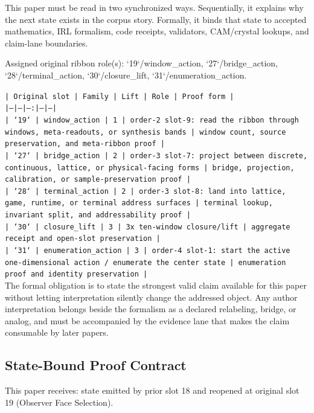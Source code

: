 \documentclass[11pt]{article}
\begin{document}
This paper must be read in two synchronized ways. Sequentially, it explains why
the next state exists in the corpus story. Formally, it binds that state to
accepted mathematics, IRL formalism, code receipts, validators, CAM/crystal
lookups, and claim-lane boundaries.

Assigned original ribbon role(s): `19`/window\_action, `27`/bridge\_action, `28`/terminal\_action, `30`/closure\_lift, `31`/enumeration\_action.

\noindent\texttt{| Original slot | Family | Lift | Role | Proof form |}\\
\noindent\texttt{|---|---|---:|---|---|}\\
\noindent\texttt{| `19` | window\_action | 1 | order-2 slot-9: read the ribbon through windows, meta-readouts, or synthesis bands | window count, source preservation, and meta-ribbon proof |}\\
\noindent\texttt{| `27` | bridge\_action | 2 | order-3 slot-7: project between discrete, continuous, lattice, or physical-facing forms | bridge, projection, calibration, or sample-preservation proof |}\\
\noindent\texttt{| `28` | terminal\_action | 2 | order-3 slot-8: land into lattice, game, runtime, or terminal address surfaces | terminal lookup, invariant split, and addressability proof |}\\
\noindent\texttt{| `30` | closure\_lift | 3 | 3x ten-window closure/lift | aggregate receipt and open-slot preservation |}\\
\noindent\texttt{| `31` | enumeration\_action | 3 | order-4 slot-1: start the active one-dimensional action / enumerate the center state | enumeration proof and identity preservation |}\\

The formal obligation is to state the strongest valid claim available for this
paper without letting interpretation silently change the addressed object. Any
author interpretation belongs beside the formalism as a declared relabeling,
bridge, or analog, and must be accompanied by the evidence lane that makes the
claim consumable by later papers.

\subsection*{State-Bound Proof Contract}

This paper receives: state emitted by prior slot 18 and reopened at original slot 19 (Observer Face Selection).
\end{document}
